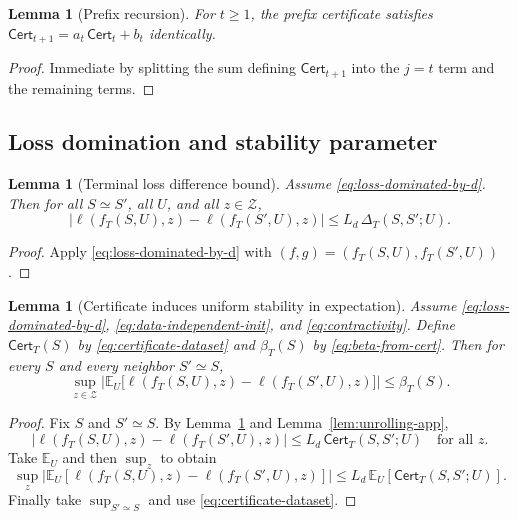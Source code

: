 \documentclass{article}
\newtheorem{lemma}[theorem]{Lemma}
\numberwithin{equation}{section}
\begin{document}
\begin{lemma}[Prefix recursion]
	\label{lem:prefix-recursion}
	For $t\ge 1$, the prefix certificate satisfies $\mathsf{Cert}_{t+1}=a_t\,\mathsf{Cert}_t+b_t$ identically.
\end{lemma}

\begin{proof}
	Immediate by splitting the sum defining $\mathsf{Cert}_{t+1}$ into the $j=t$ term and the remaining terms.
\end{proof}

\subsection{Loss domination and stability parameter}
\label{app:loss-stability}

\begin{lemma}[Terminal loss difference bound]
	\label{lem:loss-diff-bound}
	Assume \eqref{eq:loss-dominated-by-d}. Then for all $S\simeq S'$, all $U$, and all $z\in\mathcal{Z}$,
	\[
	\big|\ell(f_T(S,U),z)-\ell(f_T(S',U),z)\big|
	\le
	L_d\,\Delta_T(S,S';U).
	\]
\end{lemma}

\begin{proof}
	Apply \eqref{eq:loss-dominated-by-d} with $(f,g)=(f_T(S,U),f_T(S',U))$.
\end{proof}

\begin{lemma}[Certificate induces uniform stability in expectation]
	\label{lem:cert-to-stability}
	Assume \eqref{eq:loss-dominated-by-d}, \eqref{eq:data-independent-init}, and \eqref{eq:contractivity}.
	Define $\mathsf{Cert}_T(S)$ by \eqref{eq:certificate-dataset} and $\beta_T(S)$ by \eqref{eq:beta-from-cert}.
	Then for every $S$ and every neighbor $S'\simeq S$,
	\[
	\sup_{z\in\mathcal{Z}}
	\Big|
	\mathbb{E}_U\big[\ell(f_T(S,U),z)-\ell(f_T(S',U),z)\big]
	\Big|
	\le
	\beta_T(S).
	\]
\end{lemma}

\begin{proof}
	Fix $S$ and $S'\simeq S$.
	By Lemma~\ref{lem:loss-diff-bound} and Lemma~\ref{lem:unrolling-app},
	\[
	\big|\ell(f_T(S,U),z)-\ell(f_T(S',U),z)\big|
	\le
	L_d\,\mathsf{Cert}_T(S,S';U)
	\quad \text{for all } z.
	\]
	Take $\mathbb{E}_U$ and then $\sup_z$ to obtain
	\[
	\sup_z
	\Big|
	\mathbb{E}_U[\ell(f_T(S,U),z)-\ell(f_T(S',U),z)]
	\Big|
	\le
	L_d\,\mathbb{E}_U[\mathsf{Cert}_T(S,S';U)].
	\]
	Finally take $\sup_{S'\simeq S}$ and use \eqref{eq:certificate-dataset}.
\end{proof}
\end{document}
